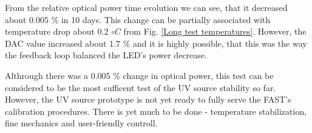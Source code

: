From the relative optical power time evolution we can see, that it decreased about 0.005 $\%$ in 10 days. This change can be partially associated with temperature drop about 0.2 $\circ C$ from Fig. \ref{Long test temperatures}. However, the DAC value increased about 1.7 $\%$ and it is highly possible, that this was the way the feedback loop balanced the LED's power decrease.

\par 
 
Althrough there was a 0.005 $\%$ change in optical power, this test can be considered to be the most sufficent test of the UV source stability so far. However, the UV source prototype is not yet ready to fully serve the FAST's calibration procedures. There is yet much to be done - temperature stabilization, fine mechanics and user-friendly controll.






